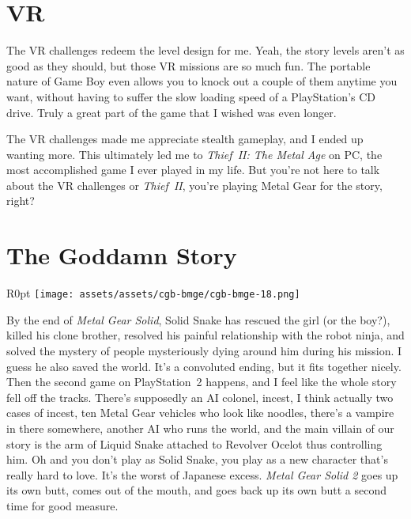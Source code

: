 \documentclass{book}
\let\oldcenter\center
\let\oldendcenter\endcenter
\renewenvironment{center}{\setlength\topsep{0pt}\oldcenter}{\oldendcenter}
\begin{document}
\FloatBarrier\needspace{10mm}\section*{VR}\nopagebreak[4]

The VR challenges redeem the level design for me. Yeah, the story levels aren’t as good as they should, but those VR missions are so much fun. The portable nature of Game Boy even allows you to knock out a couple of them anytime you want, without having to suffer the slow loading speed of a PlayStation’s CD drive. Truly a great part of the game that I wished was even longer.

\begin{center}
\vspace{8pt}
\quad\vspace{4pt}
\quad\vspace{4pt}
\end{center}

The VR challenges made me appreciate stealth gameplay, and I ended up wanting more. This ultimately led me to \emph{Thief II: The Metal Age} on PC, the most accomplished game I ever played in my life. But you’re not here to talk about the VR challenges or \emph{Thief II}, you’re playing Metal Gear for the story, right?

\FloatBarrier\needspace{10mm}\section*{The Goddamn Story}\nopagebreak[4]

\begin{wrapfigure}{R}{0pt} \texttt{[image: assets/assets/cgb-bmge/cgb-bmge-18.png]}\end{wrapfigure}
By the end of \emph{Metal Gear Solid}, Solid Snake has rescued the girl (or the boy?), killed his clone brother, resolved his painful relationship with the robot ninja, and solved the mystery of people mysteriously dying around him during his mission. I guess he also saved the world. It’s a convoluted ending, but it fits together nicely. Then the second game on PlayStation 2 happens, and I feel like the whole story fell off the tracks. There’s supposedly an AI colonel, incest, I think actually two cases of incest, ten Metal Gear vehicles who look like noodles, there’s a vampire in there somewhere, another AI who runs the world, and the main villain of our story is the arm of Liquid Snake attached to Revolver Ocelot thus controlling him. Oh and you don’t play as Solid Snake, you play as a new character that’s really hard to love. It’s the worst of Japanese excess. \emph{Metal Gear Solid 2} goes up its own butt, comes out of the mouth, and goes back up its own butt a second time for good measure.
\end{document}

